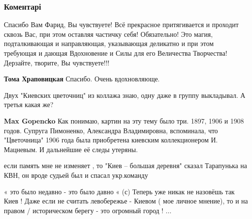  
 
 
 
 
\subsubsection{Коментарі}
\label{sec:15_09_2021.fb.fb_group.story_kiev_ua.1.kiev_derevnja_cvetochnica.cmt}

\begin{itemize} %

Спасибо Вам Фарид, Вы чувствуете! Всё прекрасное притягивается и проходит
сквозь Вас, при этом оставляя частичку себя! Обязательно! Это магия,
подталкивающая и направляющая, указывающая деликатно и при этом требующая и
дающая Вдохновение и Силы для его Величества Творчества! Дерзайте, творите, Вы
чувствуете!!!

\begin{itemize} %
\textbf{Тома Храповицкая}
Спасибо. Очень вдохновляюще.

\end{itemize} %

Двух "Киевских цветочниц" из коллажа знаю, одну даже в группу выкладывал. А
третья какая же?

\begin{itemize} %
\textbf{Max Gopencko}
Как понимаю, картин на эту тему было три.
1897, 1906 и 1908 годов.
Супруга Пимоненко, Александра Владимировна, вспоминала, что "Цветочница" 1906 года была приобретена киевским коллекционером И. Мацневым. И дальнейшие её следы утеряны.
\end{itemize} %

если память мне не изменяет , то "Киев – большая деревня" сказал Тарапунька на
КВН, он вроде судьей был и спасал укр.команду



« это было недавно - это было давно « (с) Теперь уже никак не назовёшь так Киев
! Даже если не считать левобережье - Киевом ( мое личное мнение), то и на
правом / историческом берегу - это огромный город ! ...


\end{itemize}
